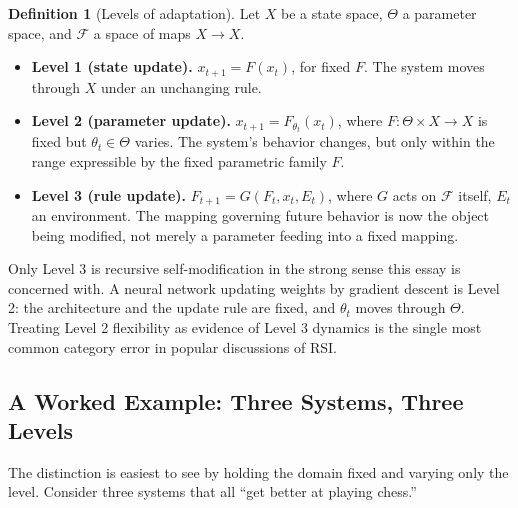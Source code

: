 \documentclass[11pt,a4paper]{article}
\theoremstyle{plain}
\theoremstyle{definition}
\newtheorem{definition}[theorem]{Definition}
\theoremstyle{remark}
\begin{document}
\begin{definition}[Levels of adaptation]
\label{def:levels}
Let $X$ be a state space, $\Theta$ a parameter space, and $\mathcal{F}$ a space of maps $X \to X$.
\begin{itemize}
  \item \textbf{Level 1 (state update).} $x_{t+1} = F(x_t)$, for fixed $F$. The system moves through $X$ under an unchanging rule.
  \item \textbf{Level 2 (parameter update).} $x_{t+1} = F_{\theta_t}(x_t)$, where $F: \Theta \times X \to X$ is fixed but $\theta_t \in \Theta$ varies. The system's behavior changes, but only within the range expressible by the fixed parametric family $F$.
  \item \textbf{Level 3 (rule update).} $F_{t+1} = G(F_t, x_t, E_t)$, where $G$ acts on $\mathcal{F}$ itself, $E_t$ an environment. The mapping governing future behavior is now the object being modified, not merely a parameter feeding into a fixed mapping.
\end{itemize}
\end{definition}

Only Level 3 is recursive self-modification in the strong sense this essay is concerned with. A neural network updating weights by gradient descent is Level 2: the architecture and the update rule are fixed, and $\theta_t$ moves through $\Theta$. Treating Level 2 flexibility as evidence of Level 3 dynamics is the single most common category error in popular discussions of RSI.

\subsection{A Worked Example: Three Systems, Three Levels}
\label{subsec:worked-three-levels}

The distinction is easiest to see by holding the domain fixed and varying only the level. Consider three systems that all ``get better at playing chess.''
\end{document}
